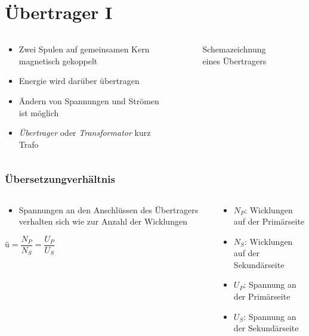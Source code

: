 
\section{Übertrager I}
\label{section:uebertrager_1}
\begin{frame}%

\begin{columns}
    \begin{column}{0.48\textwidth}
    \begin{itemize}
  \item Zwei Spulen auf gemeinsamen Kern magnetisch gekoppelt
  \item Energie wird darüber übertragen
  \item Ändern von Spannungen und Strömen ist möglich
  \item \emph{Übertrager} oder \emph{Transformator} kurz Trafo
  \end{itemize}

    \end{column}
   \begin{column}{0.48\textwidth}
       
\begin{figure}
    \caption{\scriptsize Schemazeichnung eines Übertragers}
    \label{e_uebertrager}
\end{figure}


   \end{column}
\end{columns}

\end{frame}

\begin{frame}
\frametitle{Übersetzungverhältnis}
\begin{columns}
    \begin{column}{0.48\textwidth}
    \begin{itemize}
  \item Spannungen an den Anschlüssen des Übertragers verhalten sich wie zur Anzahl der Wicklungen
  \end{itemize}
$ü = \dfrac{N_P}{N_S} = \dfrac{U_P}{U_S}$


    \end{column}
   \begin{column}{0.48\textwidth}
       \begin{itemize}
  \item $N_P$: Wicklungen auf der Primärseite
  \item $N_S$: Wicklungen auf der Sekundärseite
  \item $U_P$: Spannung an der Primärseite
  \item $U_S$: Spannung an der Sekundärseite
  \end{itemize}

   \end{column}
\end{columns}

\end{frame}

